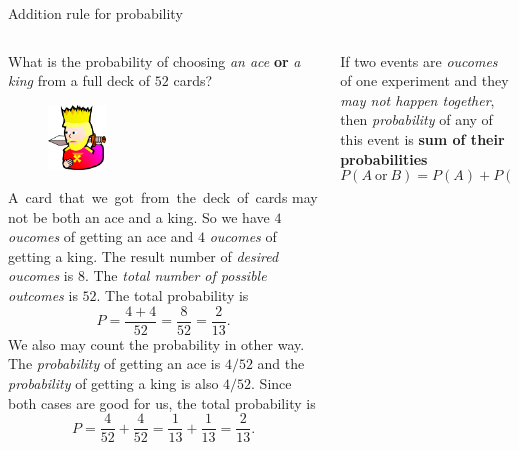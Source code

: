 \documentclass[9pt,aspectratio=169]{beamer}
\begin{document}
\begin{frame}{Addition rule for probability}
  \begin{columns}[T]
    \begin{column}{0.5\textwidth}
      \begin{problem}
        What is the probability of choosing \emph{an ace} \textbf{or} \emph{a king} from a full deck of $52$ cards?
      \end{problem}
      \begin{figure}%
        \vspace{-1em}
        \includegraphics[width=0.25\textwidth]{03 - Probability/king-clip-art.png}
      \end{figure}
      \mbox{A card that we got from the deck of cards} may not be both an ace and a king. So we have $4$ \emph{oucomes} of getting an ace and $4$ \emph{oucomes} of getting a king. The result number of \emph{desired oucomes} is $8$. The \emph{total number of possible outcomes} is $52$.
      The total probability is
      \[ P = \frac{4 + 4}{52} = \frac{8}{52} = \frac{2}{13}. \]
      We also may count the probability in other way. The \emph{probability} of getting an ace is $4/52$ and the \emph{probability} of getting a king is also $4/52$. Since both cases are good for us, the total probability is
      \[ P = \frac{4}{52} + \frac{4}{52} = \frac{1}{13} + \frac{1}{13} = \frac{2}{13}. \]
    \end{column}
    \begin{column}{0.5\textwidth}
      \begin{definition}
        If two events are \emph{oucomes} of one experiment and they \emph{may not happen together}, then \emph{probability} of any of this event is \textbf{sum of their probabilities}
        \[ P(A\ \text{or}\ B) = P(A) + P(B). \]
        \vspace*{-2.5ex}          
      \end{definition}


\end{column}
\end{columns}
\end{frame}
\end{document}
